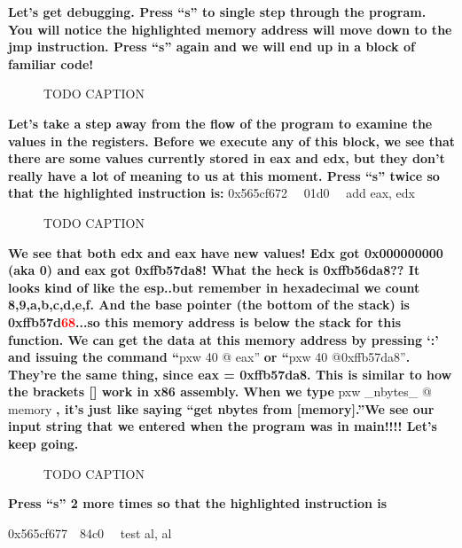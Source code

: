 \documentclass[letterpaper]{article}
\newcommand{\sitfig}[3]{
\begin{figure}[H]
\centering
\makebox[\textwidth][c]{
#2
}
\caption{#3}
\label{#1}
\end{figure}
}
\newcommand{\sitgfx}[4][scale=1.0]{
\sitfig{#3}{\texttt{[image: \#2]}}{#4}
}
\begin{document}
\textbf{Let's get debugging. Press ``s'' to single step through the program. You will notice the highlighted memory
address will move down to the jmp instruction. Press ``s'' again and we will end up in a block of familiar code!} 

\sitgfx[width=6.5in,height=3.778in]{FINALWORKINGDOCFORMERLYPRECURSOR-img033.png}{fig:unk}{TODO CAPTION}
 

\textbf{Let's take a step away from the flow of the program to examine the values in the registers. Before we execute
any of this block, we see that there are some values currently stored in eax and edx, but  they don't really have a lot
of meaning to us at this moment. Press ``s'' twice so that the highlighted instruction is: \newline
}0x565cf672  \ \ 01d0  \ \ add eax, edx\newline
  
\sitgfx[width=6.5in,height=1.4445in]{FINALWORKINGDOCFORMERLYPRECURSOR-img034.png}{fig:unk}{TODO CAPTION}
 

\textbf{We see that both edx and eax have new values! Edx got 0x000000000 (aka 0) and eax got 0xffb57da8! What the heck
is 0xffb56da8?? It looks kind of like the esp..but remember in hexadecimal we count 8,9,a,b,c,d,e,f. And the base
pointer (the bottom of the stack) is 0xffb57d}\textbf{\textcolor{red}{68}}\textbf{...so this memory address is below
the stack for this function. \newline
We can get the data at this memory address by pressing `:' and issuing the command ``}pxw 40 @ eax'' \textbf{or ``}pxw
40 @0xffb57da8''\textbf{. They're the same thing, since eax = 0xffb57da8. This is similar to how the brackets [] work
in x86 assembly. When we type }pxw \_nbytes\_ @ memory \textbf{, it's just like saying ``get nbytes from [memory].''We
see our input string that we entered when the program was in main!!!!  Let's keep going.}\newline
   
\sitgfx[width=6.5in,height=1.389in]{FINALWORKINGDOCFORMERLYPRECURSOR-img035.png}{fig:unk}{TODO CAPTION}
 

\textbf{Press ``s'' 2 more times so that the highlighted instruction is  \ \ }

0x565cf677\ \ 84c0  \ \ test al, al
\end{document}
